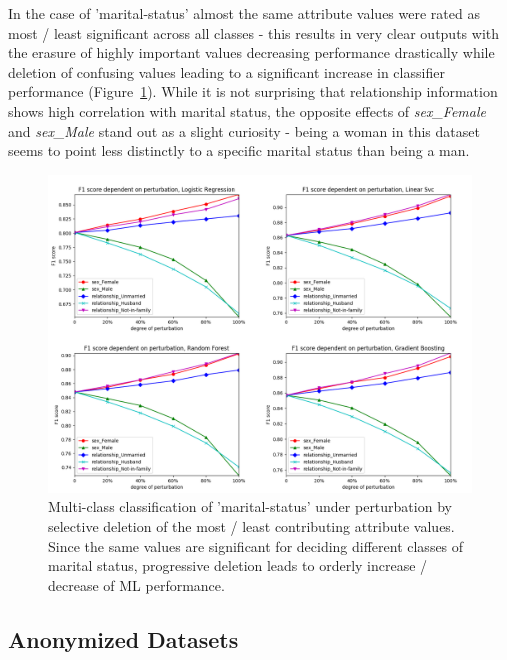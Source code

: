 \documentclass{llncs}
\begin{document}
In the case of 'marital-status' almost the same attribute values were rated as most / least significant across all classes - this results in very clear outputs with the erasure of highly important values decreasing performance drastically while deletion of confusing values leading to a significant increase in classifier performance (Figure~\ref{fig:results_perturbation_marital_status}). While it is not surprising that relationship information shows high correlation with marital status, the opposite effects of \textit{sex\_Female} and \textit{sex\_Male} stand out as a slight curiosity - being a woman in this dataset seems to point less distinctly to a specific marital status than being a man.


\begin{figure}[H]
	\centering
	\includegraphics[width=1\textwidth]{figures/perturbation/adults_marital_status/perturb_marital_combined}
	\caption{Multi-class classification of 'marital-status' under perturbation by selective deletion of the most / least contributing attribute values. Since the same values are significant for deciding different classes of marital status, progressive deletion leads to orderly increase / decrease of ML performance.}
	\label{fig:results_perturbation_marital_status}
\end{figure}



\subsection{Anonymized Datasets}
\label{ssect:anonymized_ds}
\end{document}
